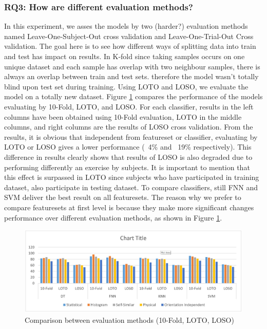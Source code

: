 \documentclass[journal,article,submit,moreauthors,pdftex]{Definitions/mdpi}
\begin{document}
\subsubsection{RQ3: How are different evaluation methods?}
In this experiment, we asses the models by two (harder?) evaluation methods named Leave-One-Subject-Out cross validation and Leave-One-Trial-Out Cross validation. The goal here is to see how different ways of splitting data into train and test has impact on results. In K-fold since taking samples occurs on one unique dataset and each sample has overlap with two neighbour samples, there is always an overlap between train and test sets. therefore the model wasn't totally blind upon test set during training. Using LOTO and LOSO, we evaluate the model on a totally new dataset. Figure \ref{fig:evaluation_comparison} compares the performance of the models evaluating by 10-Fold, LOTO, and LOSO. For each classifier, results in the left columns have been obtained using 10-Fold evaluation, LOTO in the middle columns, and right columns are the results of LOSO cross validation. From the results, it is obvious that independent from featureset or classifier, evaluating by LOTO or LOSO gives a lower performance (~4\% and ~19\% respectively). This difference in results clearly shows that results of LOSO is also degraded due to performing differently an exercise by subjects. It is important to mention that this effect is surpassed in LOTO since subjects who have participated in training dataset, also participate in testing dataset. To compare classifiers, still FNN and SVM deliver the best result on all featuresets. The reason why we prefer to compare featuresets at first level is because they make more significant changes performance over different evaluation methods, as shown in Figure \ref{fig:evaluation_comparison}.
\begin{figure}[H]
	\centering
	\includegraphics[width=14 cm]{Definitions/images/evaluation_comparison.jpg}
	\caption{Comparison between evaluation methods (10-Fold, LOTO, LOSO)}
	\label{fig:evaluation_comparison}
\end{figure} 
\end{document}
